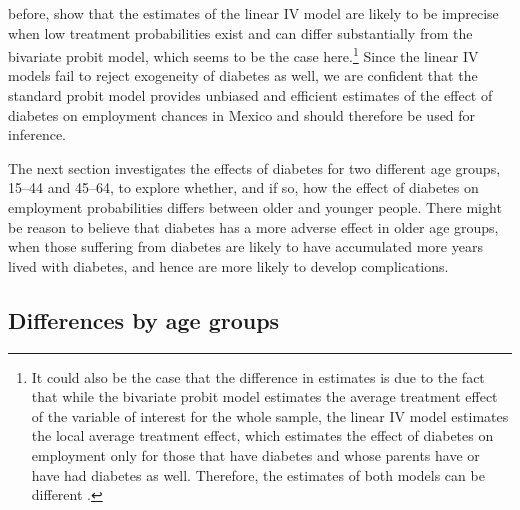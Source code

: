 before, \textcite{Chiburis2012} show that the estimates of the linear
\ac{IV} model are likely to be imprecise when low treatment probabilities
exist and can differ substantially from the bivariate probit model,
which seems to be the case here.\footnote{It could also be the case that the difference in estimates is due
to the fact that while the bivariate probit model estimates the average treatment effect
of the variable of interest for the whole sample, the linear \ac{IV}
model estimates the local average treatment effect, which estimates the effect of diabetes
on employment only for those that have diabetes and whose parents
have or have had diabetes as well. Therefore, the estimates of both
models can be different \parencite{Angrist2009a,Chiburis2012}.} Since the linear \ac{IV} models fail to reject exogeneity of diabetes
as well, we are confident that the standard probit model provides
unbiased and efficient estimates of the effect of diabetes on employment
chances in Mexico and should therefore be used for inference.


The next section investigates the effects of diabetes for
two different age groups, 15--44 and 45--64, to explore whether, and
if so, how the effect of diabetes on employment probabilities differs between
older and younger people. There might be reason to believe that diabetes
has a more adverse effect in older age groups, when those suffering
from diabetes are likely to have accumulated more years lived with
diabetes, and hence are more likely to develop complications. 

\subsection{Differences by age groups}



